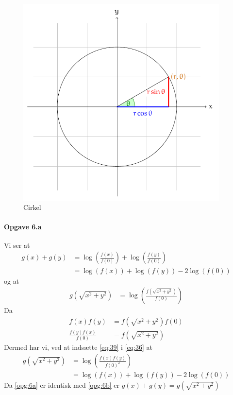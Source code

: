 \documentclass{article} %
\begin{document}
 \begin{figure}[htbp]
 	\centering
 	\includegraphics[width=0.95\textwidth]{unitcirle.pdf}
 	\caption{Cirkel}
 	\label{fig:label}
 \end{figure}
\paragraph*{Opgave 6.a}
Vi ser at
\begin{align}
g(x)+g(y)               & = \log\left(\frac{f(x)}{f(0)}\right) + \log\left(\frac{f(y)}{f(0)}\right) \\
                        & = \log(f(x))+\log(f(y))-2\log(f(0))\label{opg:6a}
\end{align}
og at
\begin{align}
g(\sqrt{x^2+y^2})       & = \log\left(\frac{f(\sqrt{x^2+y^2})}{f(0)}\right) \label{eq:36}
\end{align}
Da
\begin{align}
f(x)f(y)                & =f(\sqrt{x^2+y^2})f(0) \\
\frac{f(y)f(x)}{f(0)} & =f(\sqrt{x^2+y^2}) \label{eq:39}
\end{align}
Dermed har vi, ved at indsætte \cref{eq:39} i \cref{eq:36} at
\begin{align}
g(\sqrt{x^2+y^2})       & = \log\left(\frac{f(x)f(y)}{f(0)^2}\right) \\
                        & = \log(f(x))+\log(f(y))-2\log(f(0))\label{opg:6b}
\end{align}
Da \cref{opg:6a} er identisk med \cref{opg:6b} er \(g(x)+g(y)=g(\sqrt{x^2+y^2})\)
\end{document}

